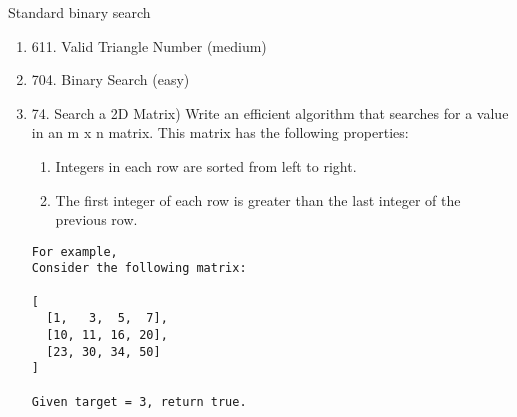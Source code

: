 \documentclass[main.tex]{subfiles}
\begin{document}
Standard binary search
\begin{enumerate}
    \item 611. Valid Triangle Number (medium)
    \item 704. Binary Search (easy)
    
\item  74. Search a 2D Matrix) Write an efficient algorithm that searches for a value in an m x n matrix. This matrix has the following properties:
\begin{enumerate}
    \item Integers in each row are sorted from left to right.
    \item The first integer of each row is greater than the last integer of the previous row.
    \end{enumerate}
\begin{lstlisting}[numbers=none]
For example,
Consider the following matrix:

[
  [1,   3,  5,  7],
  [10, 11, 16, 20],
  [23, 30, 34, 50]
]

Given target = 3, return true.
\end{lstlisting}

        


\end{enumerate}
\end{document}
